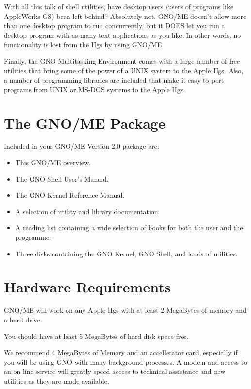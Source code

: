 With all this talk of shell utilities, have
desktop users (users of programs like AppleWorks GS) been left
behind? Absolutely not. GNO/ME doesn't allow more than one
desktop program to run concurrently, but it DOES let you run a
desktop program with as many text applications as you like. In
other words, no functionality is lost from the IIgs by using
GNO/ME.

Finally, the GNO Multitasking Environment
comes with a large number of free utilities that bring some of
the power of a UNIX system to the Apple IIgs. Also, a number of
programming libraries are included that make it easy to port
programs from UNIX or MS-DOS systems to the Apple IIgs.

\chapter{The GNO/ME Package}

Included in your GNO/ME Version 2.0 package are:
\begin{itemize}
\item	This GNO/ME overview.
\item	The GNO Shell User's Manual.
\item	The GNO Kernel Reference Manual.
\item	A selection of utility and library documentation.
\item	A reading list containing a wide selection of books 
	for both the user and the programmer
\item	Three disks containing the GNO Kernel, GNO Shell, and 
	loads of utilities.
\end{itemize}

\chapter{Hardware Requirements}

GNO/ME will work on any Apple IIgs with at least 2 MegaBytes of
memory and a hard drive.

You should have at least 5 MegaBytes of hard disk space free.

We recommend 4 MegaBytes of Memory and an 
accellerator card, especially if you will be using GNO with many
background processes. A modem and access to an on-line service
will greatly speed access to technical assistance and new
utilities as they are made available.


\parindent=20pt


